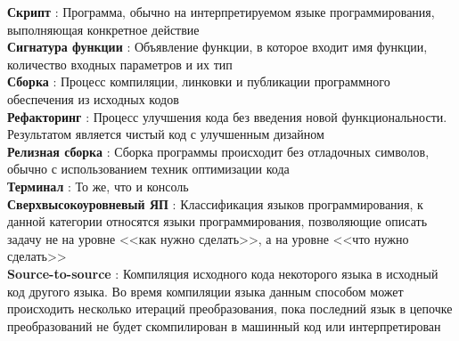 \textbf{Скрипт}                  : Программа, обычно на интерпретируемом языке программирования, выполняющая конкретное действие                     \\
\textbf{Сигнатура функции}       : Объявление функции, в которое входит имя функции, количество входных параметров и их тип                          \\
\textbf{Сборка}                  : Процесс компиляции, линковки и публикации программного обеспечения из исходных кодов                              \\
\textbf{Рефакторинг}             : Процесс улучшения кода без введения новой функциональности. Результатом является чистый код с улучшенным дизайном \\
\textbf{Релизная сборка}         : Сборка программы происходит без отладочных символов, обычно с использованием техник оптимизации кода              \\
\textbf{Терминал}                : То же, что и консоль                                                                                              \\
\textbf{Сверхвысокоуровневый ЯП} : Классификация языков программирования, к данной категории относятся языки программирования,
позволяющие описать задачу не на уровне <<как нужно сделать>>, а на уровне <<что нужно сделать>>                                                     \\
\textbf{Source-to-source} : Компиляция исходного кода некоторого языка в исходный код другого языка. Во время компиляции языка данным способом
 может происходить несколько итераций преобразования, пока последний язык в цепочке преобразований не будет скомпилирован в машинный код или интерпретирован\\
